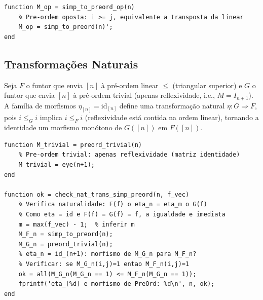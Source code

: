 \begin{lstlisting}[style=matlab, caption={Pré-ordem oposta: funtor contravariante}]
function M_op = simp_to_preord_op(n)
    % Pre-ordem oposta: i >= j, equivalente a transposta da linear
    M_op = simp_to_preord(n)';
end
\end{lstlisting}

\subsection{Transformações Naturais}

\begin{definition}
Seja $F$ o funtor que envia $[n]$ à pré-ordem linear $\leq$ (triangular superior) e $G$ o funtor que envia $[n]$ à pré-ordem trivial (apenas reflexividade, i.e., $M = I_{n+1}$). A família de morfismos $\eta_{[n]} = \mathrm{id}_{[n]}$ define uma transformação natural $\eta: G \Rightarrow F$, pois $i \leq_{G} i$ implica $i \leq_{F} i$ (reflexividade está contida na ordem linear), tornando a identidade um morfismo monótono de $G([n])$ em $F([n])$.
\end{definition}

\begin{lstlisting}[style=matlab, caption={Transformação natural $\eta: G \Rightarrow F$ --- pré-ordem trivial para linear}]
function M_trivial = preord_trivial(n)
    % Pre-ordem trivial: apenas reflexividade (matriz identidade)
    M_trivial = eye(n+1);
end

function ok = check_nat_trans_simp_preord(n, f_vec)
    % Verifica naturalidade: F(f) o eta_n = eta_m o G(f)
    % Como eta = id e F(f) = G(f) = f, a igualdade e imediata
    m = max(f_vec) - 1;  % inferir m
    M_F_n = simp_to_preord(n);
    M_G_n = preord_trivial(n);
    % eta_n = id_(n+1): morfismo de M_G_n para M_F_n?
    % Verificar: se M_G_n(i,j)=1 entao M_F_n(i,j)=1
    ok = all(M_G_n(M_G_n == 1) <= M_F_n(M_G_n == 1));
    fprintf('eta_[%d] e morfismo de PreOrd: %d\n', n, ok);
end
\end{lstlisting}
